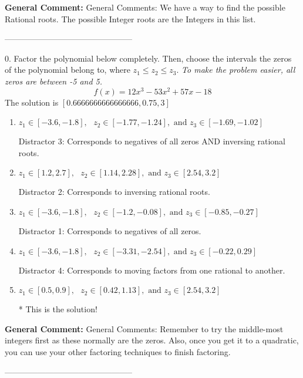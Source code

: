 \documentclass{extbook}[14pt]
\begin{document}
\textbf{General Comment:} General Comments: We have a way to find the possible Rational roots. The possible Integer roots are the Integers in this list. 

-----------------------------------------------

0. Factor the polynomial below completely. Then, choose the intervals the zeros of the polynomial belong to, where $z_1 \leq z_2 \leq z_3$. \textit{To make the problem easier, all zeros are between -5 and 5.}
\[ f(x) = 12x^{3} -53 x^{2} +57 x -18 \] 
The solution is $ [0.6666666666666666, 0.75, 3] $ 

\begin{enumerate}[label=\Alph*.] 
\item $ z_1 \in [-3.6, -1.8], \text{   }  z_2 \in [-1.77, -1.24], \text{   and   } z_3 \in [-1.69, -1.02] $ 

  Distractor 3: Corresponds to negatives of all zeros AND inversing rational roots. 
\item $ z_1 \in [1.2, 2.7], \text{   }  z_2 \in [1.14, 2.28], \text{   and   } z_3 \in [2.54, 3.2] $ 

  Distractor 2: Corresponds to inversing rational roots. 
\item $ z_1 \in [-3.6, -1.8], \text{   }  z_2 \in [-1.2, -0.08], \text{   and   } z_3 \in [-0.85, -0.27] $ 

  Distractor 1: Corresponds to negatives of all zeros. 
\item $ z_1 \in [-3.6, -1.8], \text{   }  z_2 \in [-3.31, -2.54], \text{   and   } z_3 \in [-0.22, 0.29] $ 

  Distractor 4: Corresponds to moving factors from one rational to another. 
\item $ z_1 \in [0.5, 0.9], \text{   }  z_2 \in [0.42, 1.13], \text{   and   } z_3 \in [2.54, 3.2] $ 

 * This is the solution! 
\end{enumerate} 
 
\textbf{General Comment:} General Comments: Remember to try the middle-most integers first as these normally are the zeros. Also, once you get it to a quadratic, you can use your other factoring techniques to finish factoring. 

-----------------------------------------------
\end{document}

